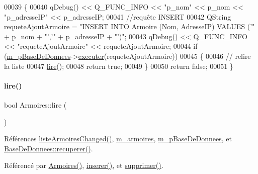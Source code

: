 \begin{DoxyCode}
00039 \{
00040     qDebug() << Q\_FUNC\_INFO << \textcolor{stringliteral}{"p\_nom"} << p\_nom << \textcolor{stringliteral}{"p\_adresseIP"} << p\_adresseIP;
00041     \textcolor{comment}{//requête INSERT}
00042     QString requeteAjoutArmoire = \textcolor{stringliteral}{"INSERT INTO Armoire (Nom, AdresseIP) VALUES ('"} + p\_nom + \textcolor{stringliteral}{"','"} + 
      p\_adresseIP + \textcolor{stringliteral}{"')"};
00043     qDebug() << Q\_FUNC\_INFO << \textcolor{stringliteral}{"requeteAjoutArmoire"} << requeteAjoutArmoire;
00044     \textcolor{keywordflow}{if} (\hyperlink{class_armoires_a096a57892eaad473fefc2a20fe4965bd}{m\_pBaseDeDonnees}->\hyperlink{class_base_de_donnees_aa8de5f8f8bb17edc43f5c0ee33712081}{executer}(requeteAjoutArmoire))
00045     \{
00046         \textcolor{comment}{// relire la liste}
00047         \hyperlink{class_armoires_a2b64b3df08cf848d06b4ffb6a49ae858}{lire}();
00048         \textcolor{keywordflow}{return} \textcolor{keyword}{true};
00049     \}
00050     \textcolor{keywordflow}{return} \textcolor{keyword}{false};
00051 \}
\end{DoxyCode}
\mbox{\label{class_armoires_a2b64b3df08cf848d06b4ffb6a49ae858}} 
\paragraph{\texorpdfstring{lire()}{lire()}}
{\footnotesize\ttfamily bool Armoires\+::lire (\begin{DoxyParamCaption}{ }\end{DoxyParamCaption})}



Références \hyperlink{class_armoires_a5d1b239d24b608ce8f41677d0fbe3507}{liste\+Armoires\+Changed()}, \hyperlink{class_armoires_a13bc03c96ba9e069bc377f6ea10472ba}{m\+\_\+armoires}, \hyperlink{class_armoires_a096a57892eaad473fefc2a20fe4965bd}{m\+\_\+p\+Base\+De\+Donnees}, et \hyperlink{class_base_de_donnees_a77539baad389f5acf754cd2cd452403e}{Base\+De\+Donnees\+::recuperer()}.



Référencé par \hyperlink{class_armoires_a0783981e55af5badbcb4b8eb5a52a0eb}{Armoires()}, \hyperlink{class_armoires_a0aa944d8f94667783ea95424e1915aba}{inserer()}, et \hyperlink{class_armoires_aa8cb545cec5ebf4603dff93e87662cc9}{supprimer()}.


